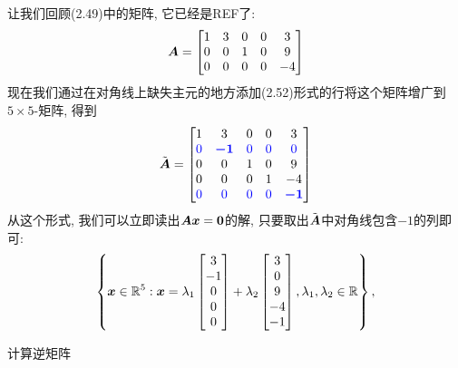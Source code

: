 \begin{example}[负1技巧]
    让我们回顾(2.49)中的矩阵, 它已经是REF了:
    \begin{equation}
        \boldsymbol{A} =
        \begin{bmatrix}
            1 & 3 & 0 & 0 & 3 \\
            0 & 0 & 1 & 0 & 9 \\
            0 & 0 & 0 & 0 & -4
        \end{bmatrix}
    \end{equation}
    现在我们通过在对角线上缺失主元的地方添加(2.52)形式的行将这个矩阵增广到$5 \times 5$-矩阵, 得到
    \begin{equation}
        \tilde{\boldsymbol{A}} =
        \begin{bmatrix}
            1 & 3 & 0 & 0 & 3 \\
            \color{blue} 0 & \color{blue} \boldsymbol{-1} & \color{blue} 0 & \color{blue} 0 & \color{blue} 0 \\
            0 & 0 & 1 & 0 & 9 \\
            0 & 0 & 0 & 1 & -4 \\
            \color{blue} 0 & \color{blue} 0 & \color{blue} 0 & \color{blue} 0 & \color{blue} \boldsymbol{-1} \\
        \end{bmatrix}
    \end{equation}
    从这个形式, 我们可以立即读出$\boldsymbol{A}\boldsymbol{x}=\boldsymbol{0}$的解,
    只要取出$\tilde{\boldsymbol{A}}$中对角线包含$-1$的列即可:
    \begin{equation}
        \left\{
            \boldsymbol{x} \in \mathbb{R}^5:
            \boldsymbol{x} = \lambda_1
            \begin{bmatrix}
                3 \\ -1 \\ 0 \\ 0 \\ 0
            \end{bmatrix}
            + \lambda_2
            \begin{bmatrix}
                3 \\ 0 \\ 9 \\ -4 \\ -1
            \end{bmatrix},
            \lambda_1, \lambda_2 \in \mathbb{R}
        \right\},
    \end{equation}
\end{example}

\begin{center} 计算逆矩阵 \end{center}

